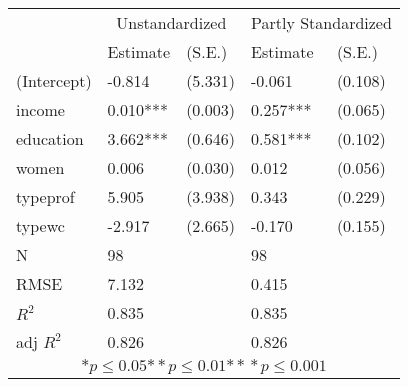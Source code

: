 \begin{tabular}{*{5}{l}}
\hline
                  & \multicolumn{2}{c}{Unstandardized} & \multicolumn{2}{c}{Partly Standardized}   \tabularnewline
                   &Estimate  &(S.E.)    &Estimate  &(S.E.)  \tabularnewline
 \hline
 \hline
   (Intercept)     &-0.814   &   (5.331) &-0.061   &   (0.108) \tabularnewline
   income          &0.010***   &   (0.003) &0.257***   &   (0.065) \tabularnewline
   education       &3.662***   &   (0.646) &0.581***   &   (0.102) \tabularnewline
   women           &0.006   &   (0.030) &0.012   &   (0.056) \tabularnewline
   typeprof        &5.905   &   (3.938) &0.343   &   (0.229) \tabularnewline
   typewc          &-2.917   &   (2.665) &-0.170   &   (0.155) \tabularnewline
 \hline
 N                 &98       &        &98       &        \tabularnewline
 RMSE             &7.132         & &0.415         & \tabularnewline
 $R^2$             &0.835         & &0.835         & \tabularnewline
 adj $R^2$         &0.826         & &0.826         & \tabularnewline
 \hline
\hline
 
 \multicolumn{5}{c}{${*  p}\le 0.05$${*\!\!*  p}\le 0.01$${*\!\!*\!\!*  p}\le 0.001$}\tabularnewline
 \end{tabular}